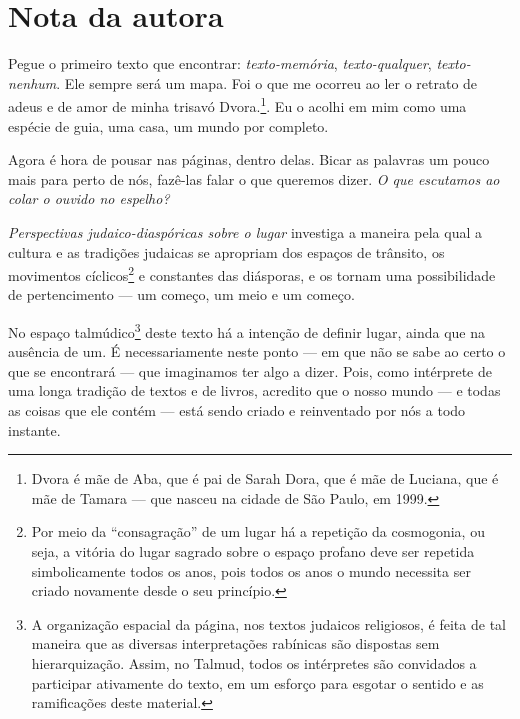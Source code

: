 \chapter{Nota da autora}

\noindent{}Pegue o primeiro texto que encontrar: \emph{texto-memória},
\emph{texto-qualquer}, \emph{texto-nenhum}. Ele sempre será um mapa. Foi
o que me ocorreu ao ler o retrato de adeus e de amor de minha trisavó
Dvora.\footnote{Dvora é mãe de Aba, que é pai de Sarah Dora, que é mãe de
  Luciana, que é mãe de Tamara --- que nasceu na cidade de São Paulo, em 1999.}. 
  Eu o acolhi em mim como uma espécie de guia, uma casa, um
mundo por completo.

Agora é hora de pousar nas páginas, dentro delas. Bicar as palavras um
pouco mais para perto de nós, fazê-las falar o que queremos dizer. \emph{O que escutamos ao colar o ouvido no espelho?}

\emph{Perspectivas judaico-diaspóricas sobre o lugar} investiga a
maneira pela qual a cultura e as tradições judaicas se apropriam dos
espaços de trânsito, os movimentos cíclicos\footnote{Por meio da
  ``consagração'' de um lugar há a repetição da cosmogonia, ou seja, a
  vitória do lugar sagrado sobre o espaço profano deve ser
  repetida simbolicamente todos os anos, pois todos os anos o mundo
  necessita ser criado novamente desde o seu princípio.} e constantes
das diásporas, e os tornam uma possibilidade de pertencimento --- um
começo, um meio e um começo.

No espaço talmúdico\footnote{A organização espacial da página,
  nos textos judaicos religiosos, é feita de tal maneira que as diversas
  interpretações rabínicas são dispostas sem hierarquização. Assim, no
Talmud, todos os intérpretes são convidados a participar
  ativamente do texto, em um esforço para esgotar o sentido e as
  ramificações deste material.} deste texto há a intenção de definir
lugar, ainda que na ausência de um. É necessariamente neste ponto --- em
que não se sabe ao certo o que se encontrará --- que imaginamos ter algo
a dizer. Pois, como intérprete de uma longa tradição de textos e de
livros, acredito que o nosso mundo --- e todas as coisas que ele contém
--- está sendo criado e reinventado por nós a todo instante.

